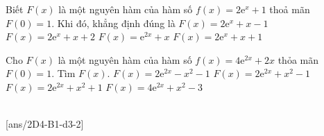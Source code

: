 \begin{ex}%
	Biết $ F(x)$ là một nguyên hàm của hàm số $ f(x)=2\mathrm{e}^x+1 $ thoả mãn $ F(0)=1 $. Khi đó, khẳng định đúng là
	\choice
	{\True $F(x)=2\mathrm{e}^x+x-1$}
	{$F(x)=2\mathrm{e}^x+x+2$}
	{$F(x)=\mathrm{e}^{2x}+x$}
	{$F(x)=2\mathrm{e}^x+x+1$}
\end{ex}


\begin{ex}
	Cho $F(x)$ là một nguyên hàm của hàm số $f(x)=4\mathrm{e}^{2x}+2x$ thỏa mãn $F(0)=1$. Tìm $F(x)$.
	\choice
	{$F(x)=2\mathrm{e}^{2x}-x^2-1$}
	{\True $F(x)=2\mathrm{e}^{2x}+x^2-1$}
	{$F(x)=2\mathrm{e}^{2x}+x^2+1$}
	{$F(x)=4\mathrm{e}^{2x}+x^2-3$}
\end{ex}

 \\
[ans/2D4-B1-d3-2]

